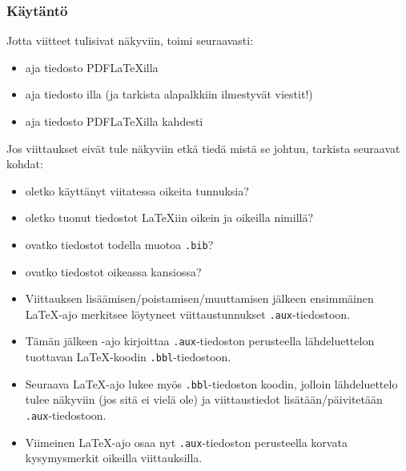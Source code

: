 \begin{frame}[fragile]
    \frametitle{Käytäntö}
    Jotta viitteet tulisivat näkyviin, toimi seuraavasti:
    \begin{itemize}
        \item aja tiedosto PDFLaTeXilla
        \item aja tiedosto \BibTeX{}illa (ja tarkista alapalkkiin ilmestyvät viestit!)
        \item aja tiedosto PDFLaTeXilla kahdesti
    \end{itemize} 
    Jos viittaukset eivät tule näkyviin etkä tiedä mistä se johtuu, tarkista seuraavat kohdat:
    \begin{itemize}
        \item oletko käyttänyt viitatessa oikeita tunnuksia?
        \item oletko tuonut tiedostot \LaTeX iin oikein ja oikeilla nimillä?
        \item ovatko tiedostot todella muotoa \verb-.bib-?
        \item ovatko tiedostot oikeassa kansiossa?
    \end{itemize}
\end{frame}
\begin{frame}[fragile]
    \begin{extra}
        \begin{itemize}
            \item Viittauksen lisäämisen/poistamisen/muuttamisen jälkeen ensimmäinen \LaTeX-ajo merkitsee löytyneet viittaustunnukset \verb-.aux--tiedostoon.
            \item Tämän jälkeen \BibTeX-ajo kirjoittaa \verb-.aux--tiedoston perusteella lähdeluettelon tuottavan \LaTeX-koodin \verb-.bbl--tiedostoon.
            \item Seuraava \LaTeX-ajo lukee myös \verb-.bbl--tiedoston koodin, jolloin lähdeluettelo tulee näkyviin (jos sitä ei vielä ole) ja viittaustiedot lisätään/päivitetään \verb-.aux--tiedostoon.
            \item Viimeinen \LaTeX-ajo osaa nyt \verb-.aux--tiedoston perusteella korvata kysymysmerkit oikeilla viittauksilla.
        \end{itemize}
    \end{extra}
\end{frame}
